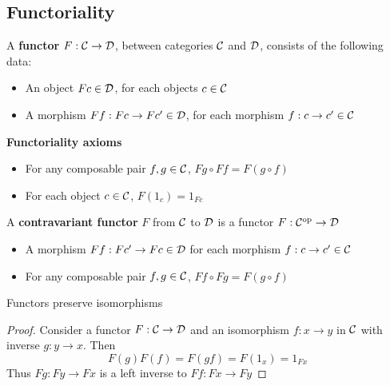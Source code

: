 \documentclass[11pt]{article}
\def \Cop {\calc^{\op}}
\begin{document}
\subsection{Functoriality}
\label{sec:orgcf39a04}
\begin{definition}[]
A \textbf{functor} \(F:\mathcal{C}\to\mathcal{D}\), between categories \(\mathcal{C}\) and \(\mathcal{D}\), consists of the following data:
\begin{itemize}
\item An object \(Fc\in\mathcal{D}\), for each objects \(c\in\mathcal{C}\)
\item A morphism \(Ff:Fc\to Fc'\in\mathcal{D}\), for each morphism \(f:c\to c'\in\mathcal{C}\)
\end{itemize}


\textbf{Functoriality axioms}
\begin{itemize}
\item For any composable pair \(f,g\in\mathcal{C}\), \(Fg\circ Ff=F(g\circ f)\)
\item For each object \(c\in\mathcal{C}\), \(F(1_c)=1_{Fc}\)
\end{itemize}
\end{definition}

\begin{definition}[]
A \textbf{contravariant functor} \(F\) from \(\mathcal{C}\) to \(\mathcal{D}\) is a functor \(F:\Cop\to\cald\)
\begin{itemize}
\item A morphism \(Ff:Fc'\to Fc\in\mathcal{D}\) for each morphism \(f:c\to c'\in\mathcal{C}\)
\item For any composable pair \(f,g\in\mathcal{C}\), \(Ff\circ Fg=F(g\circ f)\)
\end{itemize}
\end{definition}

\begin{center}\end{center}

\begin{lemma}[]
Functors preserve isomorphisms
\end{lemma}

\begin{proof}
Consider a functor \(F:\mathcal{C}\to\mathcal{D}\) and an isomorphism \(f:x\to y\) in \(\mathcal{C}\) with inverse \(g:y\to x\).
Then
\begin{equation*}
F(g)F(f)=F(gf)=F(1_x)=1_{Fx}
\end{equation*}
Thus \(Fg:Fy\to Fx\) is a left inverse to \(Ff:Fx\to Fy\)
\end{proof}
\end{document}

